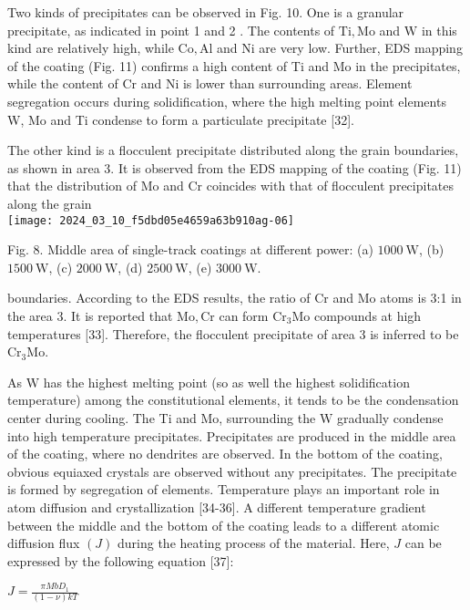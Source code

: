 \documentclass[10pt]{article}
\begin{document}
Two kinds of precipitates can be observed in Fig. 10. One is a granular precipitate, as indicated in point 1 and 2 . The contents of $\mathrm{Ti}, \mathrm{Mo}$ and $\mathrm{W}$ in this kind are relatively high, while $\mathrm{Co}, \mathrm{Al}$ and $\mathrm{Ni}$ are very low. Further, EDS mapping of the coating (Fig. 11) confirms a high content of Ti and Mo in the precipitates, while the content of $\mathrm{Cr}$ and $\mathrm{Ni}$ is lower than surrounding areas. Element segregation occurs during solidification, where the high melting point elements W, Mo and Ti condense to form a particulate precipitate [32].

The other kind is a flocculent precipitate distributed along the grain boundaries, as shown in area 3. It is observed from the EDS mapping of the coating (Fig. 11) that the distribution of Mo and $\mathrm{Cr}$ coincides with that of flocculent precipitates along the grain\\
\texttt{[image: 2024\_03\_10\_f5dbd05e4659a63b910ag-06]}

Fig. 8. Middle area of single-track coatings at different power: (a) $1000 \mathrm{~W}$, (b) $1500 \mathrm{~W}$, (c) $2000 \mathrm{~W}$, (d) $2500 \mathrm{~W}$, (e) $3000 \mathrm{~W}$.

boundaries. According to the EDS results, the ratio of $\mathrm{Cr}$ and $\mathrm{Mo}$ atoms is 3:1 in the area 3. It is reported that $\mathrm{Mo}, \mathrm{Cr}$ can form $\mathrm{Cr}_{3} \mathrm{Mo}$ compounds at high temperatures [33]. Therefore, the flocculent precipitate of area 3 is inferred to be $\mathrm{Cr}_{3} \mathrm{Mo}$.

As $\mathrm{W}$ has the highest melting point (so as well the highest solidification temperature) among the constitutional elements, it tends to be the condensation center during cooling. The Ti and Mo, surrounding the $\mathrm{W}$ gradually condense into high temperature precipitates. Precipitates are produced in the middle area of the coating, where no dendrites are observed. In the bottom of the coating, obvious equiaxed crystals are observed without any precipitates. The precipitate is formed by segregation of elements. Temperature plays an important role in atom diffusion and crystallization [34-36]. A different temperature gradient between the middle and the bottom of the coating leads to a different atomic diffusion flux $(J)$ during the heating process of the material. Here, $J$ can be expressed by the following equation [37]:

$J=\frac{\pi M b D_{1}}{(1-\nu) k T}$
\end{document}
